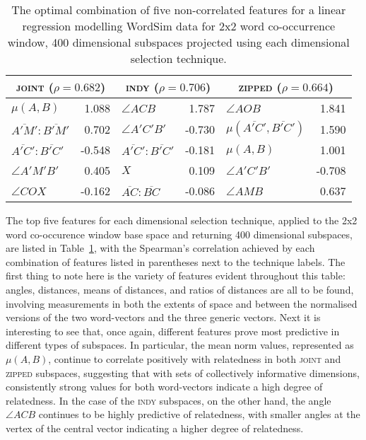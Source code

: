 \begin{table}
\centering
\begin{tabular}{lr|lr|lr}
\hline
\multicolumn{2}{c}{\textsc{joint} ($\rho = 0.682$)} & \multicolumn{2}{c}{\textsc{indy} ($\rho = 0.706$)} & \multicolumn{2}{c}{\textsc{zipped} ($\rho = 0.664$)} \\
\hline
$\mu(A,B)$ & 1.088 & $\angle ACB$ & 1.787 & $\angle AOB$ & 1.841 \\
$\overline{A'M'}:\overline{B'M'}$ & 0.702 & $\angle A'C'B'$ & -0.730 & $\mu(\overline{A'C'},\overline{B'C'})$ & 1.590 \\
$\overline{A'C'}:\overline{B'C'}$ & -0.548 & $\overline{A'C'}:\overline{B'C'}$ & -0.181 & $\mu(A,B)$ & 1.001 \\
$\angle A'M'B'$ & 0.405 & $X$ & 0.109 & $\angle A'C'B'$ & -0.708 \\
$\angle{COX}$ & -0.162 & $\overline{AC}:\overline{BC}$ & -0.086 & $\angle AMB$ & 0.637 \\
\hline
\end{tabular}
\caption{The optimal combination of five non-correlated features for a linear regression modelling WordSim data for 2x2 word co-occurrence window, 400 dimensional subspaces projected using each dimensional selection technique.}
\label{tab:fivelated}
\end{table}

The top five features for each dimensional selection technique, applied to the 2x2 word co-occurence window base space and returning 400 dimensional subspaces, are listed in Table~\ref{tab:fivelated}, with the Spearman's correlation achieved by each combination of features listed in parentheses next to the technique labels.  The first thing to note here is the variety of features evident throughout this table: angles, distances, means of distances, and ratios of distances are all to be found, involving measurements in both the extents of space and between the normalised versions of the two word-vectors and the three generic vectors.  Next it is interesting to see that, once again, different features prove most predictive in different types of subspaces.  In particular, the mean norm values, represented as $\mu(A,B)$, continue to correlate positively with relatedness in both \textsc{joint} and \textsc{zipped} subspaces, suggesting that with sets of collectively informative dimensions, consistently strong values for both word-vectors indicate a high degree of relatedness.  In the case of the \textsc{indy} subspaces, on the other hand, the angle $\angle ACB$ continues to be highly predictive of relatedness, with smaller angles at the vertex of the central vector indicating a higher degree of relatedness.

